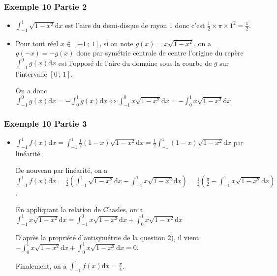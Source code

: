 \documentclass[11pt, hyperref={urlcolor=red,%
            linkcolor=blue, %
            colorlinks=true}]{beamer}
\newcommand{\Interff}[2]{\left[#1\, ;\, #2\right]}
\newcommand{\dx}{\ensuremath{\text{d}x}}		%
\begin{document}
\begin{frame}
\frametitle{Exemple  10 Partie 2}

\begin{itemize}
	\item  $\displaystyle\int_{-1}^{1}\sqrt{1-x^2}\dx$  est l'aire du demi-disque de rayon $1$ donc c'est $\frac{1}{2}\times \pi \times 1^{2}=\frac{\pi}{2}$.
	\item Pour tout réel $x \in \Interff{-1}{1}$, si on note $g(x)= x\sqrt{1-x^2}$, on a$g(-x)=-g(x)$ donc par symétrie centrale de centre l'origine du repère  $\int_{-1}^{0}g(x)\dx$ est l'opposé de l'aire du domaine sous la courbe de $g$  sur l'intervalle $\Interff{0}{1}$.

On a donc $\int_{-1}^{0}g(x)\dx = -\int_{0}^{1}g(x)\dx \Leftrightarrow  \displaystyle\int_{-1}^{0}x\sqrt{1-x^2}\dx=-\displaystyle\int_{0}^{1}x\sqrt{1-x^2}\dx $.


\end{itemize}


\end{frame}



\begin{frame}
\frametitle{Exemple  10 Partie 3}
%
%
\begin{itemize}
	
\item $\displaystyle\int_{-1}^{1}f(x)\dx = \displaystyle\int_{-1}^{1}\frac{1}{2}(1-x)\sqrt{1-x^2} \dx =\frac{1}{2}\displaystyle\int_{-1}^{1}(1-x)\sqrt{1-x^2} \dx$ par linéarité.

De nouveau par linéarité, on a $\displaystyle\int_{-1}^{1}f(x)\dx =\frac{1}{2}\left(\int_{-1}^{1}\sqrt{1-x^2} \dx - \int_{-1}^{1}x\sqrt{1-x^2} \dx\right) = \frac{1}{2}\left(\frac{\pi}{2}-  \int_{-1}^{1}x\sqrt{1-x^2}\dx \right) $.

En appliquant la relation de Chasles, on a  $ \int_{-1}^{1}x\sqrt{1-x^2}\dx = \int_{-1}^{0}x\sqrt{1-x^2}\dx + \int_{0}^{1}x\sqrt{1-x^2}\dx$

D'après la propriété d'antisymétrie de la question 2), il vient $-\int_{0}^{1}x\sqrt{1-x^2}\dx +  \int_{0}^{1}x\sqrt{1-x^2}\dx=0$.

Finalement, on a  $\boxed{\displaystyle\int_{-1}^{1}f(x)\dx = \frac{\pi}{4}}$.

\end{itemize}


\end{frame}
\end{document}
